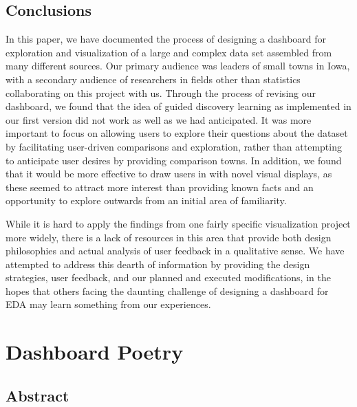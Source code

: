 \documentclass[print]{nuthesis}
\begin{document}
\hypertarget{conclusions}{%
\section{Conclusions}\label{conclusions}}

In this paper, we have documented the process of designing a dashboard for exploration and visualization of a large and complex data set assembled from many different sources. Our primary audience was leaders of small towns in Iowa, with a secondary audience of researchers in fields other than statistics collaborating on this project with us. Through the process of revising our dashboard, we found that the idea of guided discovery learning as implemented in our first version did not work as well as we had anticipated. It was more important to focus on allowing users to explore their questions about the dataset by facilitating user-driven comparisons and exploration, rather than attempting to anticipate user desires by providing comparison towns. In addition, we found that it would be more effective to draw users in with novel visual displays, as these seemed to attract more interest than providing known facts and an opportunity to explore outwards from an initial area of familiarity.

While it is hard to apply the findings from one fairly specific visualization project more widely, there is a lack of resources in this area that provide both design philosophies and actual analysis of user feedback in a qualitative sense. We have attempted to address this dearth of information by providing the design strategies, user feedback, and our planned and executed modifications, in the hopes that others facing the daunting challenge of designing a dashboard for EDA may learn something from our experiences.

\hypertarget{math-sci}{%
\chapter{Dashboard Poetry}\label{math-sci}}

\hypertarget{abstract-1}{%
\section{Abstract}\label{abstract-1}}
\end{document}
